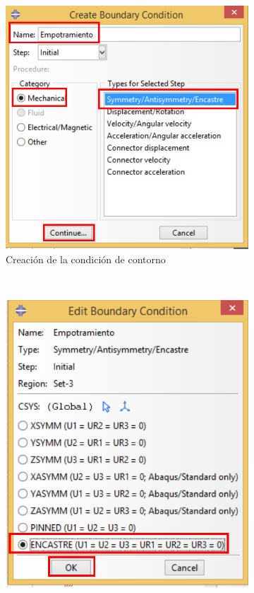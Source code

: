 \begin{enumerate}
\begin{figure}[H]
\begin{subfigure}{0.45\textwidth}
      \includegraphics[width=\textwidth]{./body/images/imagen38.pdf}
      \caption{Creación de la condición de contorno}
      \label{figu38}
    \end{subfigure}%
    ~ %
    \begin{subfigure}{0.45\textwidth}
      \includegraphics[width=\textwidth]{./body/images/imagen39.pdf}

\end{subfigure}
\end{figure}
\end{enumerate}
